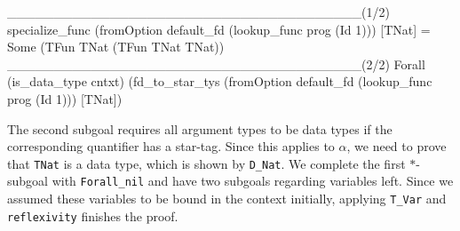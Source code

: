 \documentclass[paper = a4, fleqn, twoside]{scrreprt}
\newcommand{\coqinline}[1]{\texttt{#1}}
\begin{document}
\begin{coqcode}
______________________________________(1/2)
specialize_func (fromOption default_fd (lookup_func prog (Id 1))) [TNat] =
Some (TFun TNat (TFun TNat TNat))
______________________________________(2/2)
Forall (is_data_type cntxt)
(fd_to_star_tys (fromOption default_fd (lookup_func prog (Id 1))) [TNat])
\end{coqcode}
The second subgoal requires all argument types to be data types if the corresponding quantifier has a star-tag. Since this applies to $\alpha$, we need to prove that \coqinline{TNat} is a data type, which is shown by \coqinline{D_Nat}. We complete the first $*$-subgoal with \coqinline{Forall_nil} and have two subgoals regarding variables left. Since we assumed these variables to be bound in the context initially, applying \coqinline{T_Var} and \coqinline{reflexivity} finishes the proof.
\newpage
\end{document}
